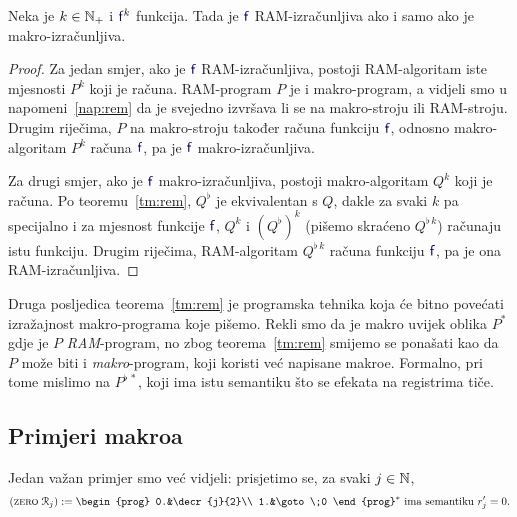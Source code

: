 \begin{korolar}[{name=[RAM-izračunljivost je ekvivalentna makro-izračunljivosti]}]\label{kor:rem}
Neka je $k\in{\mathbb N}_+$ i $\f f^k$ funkcija. Tada je $\f f$ RAM-izračunljiva ako i samo ako je makro-izračunljiva.
\end{korolar}
\begin{proof}
Za jedan smjer, ako je $\f f$ RAM-izračunljiva, postoji RAM-algoritam iste mjesnosti $P^k$ koji je računa.  RAM-program $P$ je i makro-program, a vidjeli smo u napomeni~\ref{nap:rem} da je svejedno izvršava li se na makro-stroju ili RAM-stroju. Drugim riječima, $P$ na makro-stroju također računa funkciju $\f f$, odnosno makro-algoritam $P^k$ računa $\f f$, pa je $\f f$ makro-izračunljiva.

Za drugi smjer, ako je $\f f$ makro-izračunljiva, postoji makro-algoritam $Q^k$ koji je računa. Po teoremu~\ref{tm:rem}, $Q^\flat$ je ekvivalentan s $Q$, dakle za svaki $k$ pa specijalno i za mjesnost funkcije $\f f$, $Q^k$ i $(Q^\flat)^k$ (pišemo skraćeno $Q^{\flat\,k}$) računaju istu funkciju. Drugim riječima, RAM-algoritam $Q^{\flat\,k}$ računa funkciju $\f f$, pa je ona RAM-izračunljiva.
\end{proof}

\begin{napomena}[{name=[makroi višeg reda]}]
Druga posljedica teorema~\ref{tm:rem} je programska tehnika koja će bitno povećati izražajnost makro-programa koje pišemo. Rekli smo da je makro uvijek oblika $P^*$ gdje je $P$ \emph{RAM}-program, no zbog teorema~\ref{tm:rem} smijemo se ponašati kao da $P$ može biti i \emph{makro}-program, koji koristi već napisane makroe. Formalno, pri tome mislimo na $P^{\flat\,*}$\!, koji ima istu semantiku što se efekata na registrima tiče.
\end{napomena}

\subsection{Primjeri makroa}

Jedan važan primjer smo već vidjeli: prisjetimo se, za svaki $j\in{\mathbb N}$,
\begin{equation}
(\textsc{zero}\;\reg{j}):=\begin{prog}
0.&\decr{j}{2}\\
1.&\goto\;0
\end{prog}^*\text{
 ima semantiku $r_j'=0$.}
\end{equation}


